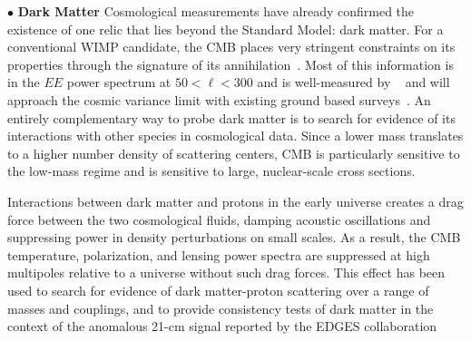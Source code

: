 \documentclass[PICOReport.tex]{subfiles}
\begin{document}

\noindent$\bullet$ {\bf Dark Matter} \hspace{0.1in} Cosmological measurements have already confirmed the existence of one relic that lies beyond the Standard Model: dark matter. For a conventional WIMP candidate, the CMB places very stringent constraints on its properties through the signature of its annihilation~\cite{Peebles:2000pn, Chen:2003gz, Padmanabhan:2005es}. Most of this information is in the $EE$ power spectrum at $50 < \ell < 300$ and is well-measured by \planck~ and will approach the cosmic variance limit with existing ground based surveys~\cite{Madhavacheril:2013cna,Green:2018pmd}.  An entirely complementary way to probe dark matter is to search for evidence of its interactions with other species in cosmological data. Since a lower mass translates to a higher number density of scattering centers, CMB is particularly sensitive to the low-mass regime and is sensitive to large, nuclear-scale cross sections. 
 
Interactions between dark matter and protons in the early universe creates a drag force between the two cosmological fluids, damping acoustic oscillations and suppressing power in density perturbations on small scales. As a result, the CMB temperature, polarization, and lensing power spectra are suppressed at high multipoles relative to a universe without such drag forces.  This effect has been used to search for evidence of dark matter-proton scattering over a range of masses and couplings, and to provide consistency tests of dark matter in the context of the anomalous 21-cm signal reported by the EDGES collaboration~\citep{2002astro.ph..2496C,2004PhRvD..70h3501S,Dvorkin:2013cea,2018PhRvL.121h1301G,2018arXiv180108609B,2018PhRvD..97j3530X,2018arXiv180800001B, 2018PhRvD..98b3013S,2018Natur.555...67B}

\end{document}
